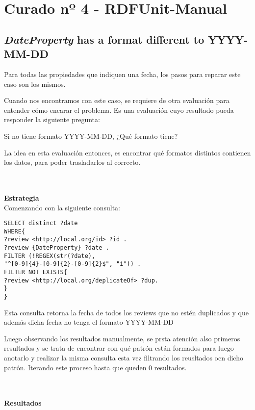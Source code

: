 \section{Curado nº 4 - RDFUnit-Manual}
\label{section:curado-manual}

\subsection*{\textit{DateProperty} has a format different to YYYY-MM-DD}
Para todas las propiedades que indiquen una fecha, los pasos para reparar este caso son los mismos.

Cuando nos encontramos con este caso, se requiere de otra evaluación para entender cómo encarar el problema. Es una evaluación cuyo resultado
pueda responder la siguiente pregunta:

Si no tiene formato YYYY-MM-DD, ¿Qué formato tiene?

La idea en esta evaluación entonces, es encontrar qué formatos distintos contienen los datos, para poder trasladarlos al correcto.

~\\\\ 
\textbf{Estrategia}\\
Comenzando con la siguiente consulta:


\begin{lstlisting}[frame=single]  
SELECT distinct ?date 
WHERE{
?review <http://local.org/id> ?id .
?review {DateProperty} ?date .
FILTER (!REGEX(str(?date), 
"^[0-9]{4}-[0-9]{2}-[0-9]{2}$", "i")) .
FILTER NOT EXISTS{
?review <http://local.org/deplicateOf> ?dup.
}
}
\end{lstlisting}



Esta consulta retorna la fecha de todos los reviews que no estén duplicados y que además dicha fecha no tenga el formato YYYY-MM-DD

Luego observando los resultados manualmente, se prsta atención also primeros resultados y se trata de encontrar con qué patrón están formados 
para luego anotarlo y realizar la misma consulta esta vez filtrando los reusltados ocn dicho patrón. Iterando este proceso hasta que 
queden 0 resultados.

~\\\\\textbf{Resultados}\\

